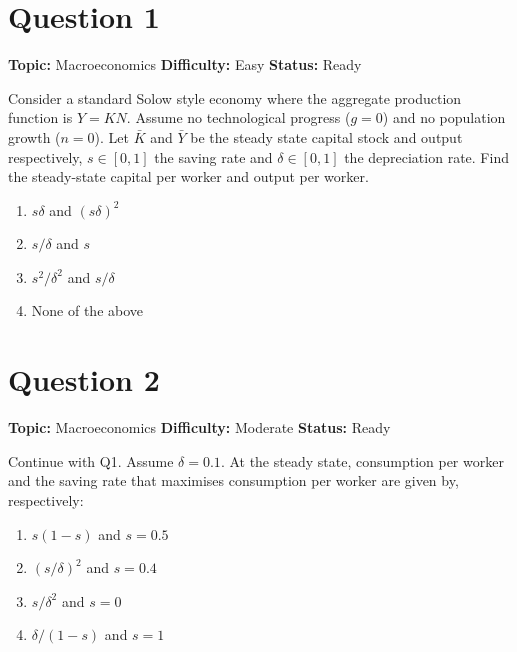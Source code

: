 \documentclass[11pt]{article}
\begin{document}
\newpage
\tableofcontents
\newpage

\section*{Question 1}


\noindent\textbf{Topic:} Macroeconomics \quad \textbf{Difficulty:} Easy \quad \textbf{Status:} Ready



Consider a standard Solow style economy where the aggregate production function is $Y = KN$. Assume no technological progress ($g=0$) and no population growth ($n=0$). Let $\bar K$ and $\bar Y$ be the steady state capital stock and output respectively, $s \in [0,1]$ the saving rate and $\delta \in [0,1]$ the depreciation rate. Find the steady-state capital per worker and output per worker.
\begin{enumerate}[label=(\Alph*)]
\item $s\delta$ and $(s\delta)^2$
\item $s/\delta$ and $s$
\item $s^2/\delta^2$ and $s/\delta$
\item None of the above
\end{enumerate}

\newpage

\section*{Question 2}


\noindent\textbf{Topic:} Macroeconomics \quad \textbf{Difficulty:} Moderate \quad \textbf{Status:} Ready



Continue with Q1. Assume $\delta = 0.1$. At the steady state, consumption per worker and the saving rate that maximises consumption per worker are given by, respectively:
\begin{enumerate}[label=(\Alph*)]
\item $s(1-s)$ and $s = 0.5$
\item $(s/\delta)^2$ and $s = 0.4$
\item $s/\delta^2$ and $s = 0$
\item $\delta/(1-s)$ and $s = 1$
\end{enumerate}

\newpage
\end{document}
